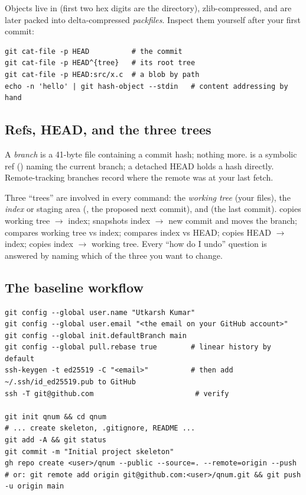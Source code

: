 Objects live in  (first two hex digits are the directory), zlib-compressed, and are later packed into delta-compressed \emph{packfiles}. Inspect them yourself after your first commit:

\begin{lstlisting}[style=sh]
git cat-file -p HEAD          # the commit
git cat-file -p HEAD^{tree}   # its root tree
git cat-file -p HEAD:src/x.c  # a blob by path
echo -n 'hello' | git hash-object --stdin   # content addressing by hand
\end{lstlisting}

\subsection{Refs, HEAD, and the three trees}

A \emph{branch} is a 41-byte file  containing a commit hash; nothing more.  is a symbolic ref () naming the current branch; a detached HEAD holds a hash directly. Remote-tracking branches  record where the remote was at your last fetch.

Three ``trees'' are involved in every command: the \emph{working tree} (your files), the \emph{index} or staging area (, the proposed next commit), and  (the last commit).  copies working tree $\to$ index;  snapshots index $\to$ new commit and moves the branch;  compares working tree vs index;  compares index vs HEAD;  copies HEAD $\to$ index;  copies index $\to$ working tree. Every ``how do I undo'' question is answered by naming which of the three you want to change.

\subsection{The baseline workflow}

\begin{lstlisting}[style=sh]
git config --global user.name "Utkarsh Kumar"
git config --global user.email "<the email on your GitHub account>"
git config --global init.defaultBranch main
git config --global pull.rebase true        # linear history by default
ssh-keygen -t ed25519 -C "<email>"          # then add ~/.ssh/id_ed25519.pub to GitHub
ssh -T git@github.com                        # verify

git init qnum && cd qnum
# ... create skeleton, .gitignore, README ...
git add -A && git status
git commit -m "Initial project skeleton"
gh repo create <user>/qnum --public --source=. --remote=origin --push
# or: git remote add origin git@github.com:<user>/qnum.git && git push -u origin main
\end{lstlisting}

